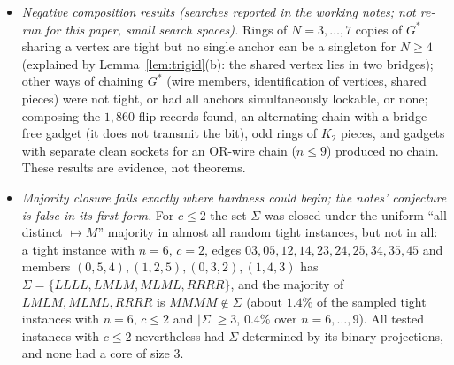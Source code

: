 {\begin{itemize}
\item \emph{Negative composition results (searches reported in the working notes; not re-run for this paper, small search spaces).} Rings of $N=3,\dots,7$ copies of $G^*$ sharing a vertex are tight but no single anchor can be a singleton for $N\ge4$ (explained by Lemma~\ref{lem:trigid}(b): the shared vertex lies in two bridges); other ways of chaining $G^*$ (wire members, identification of vertices, shared pieces) were not tight, or had all anchors simultaneously lockable, or none; composing the $1{,}860$ flip records found, an alternating chain with a bridge-free gadget (it does not transmit the bit), odd rings of $K_2$ pieces, and gadgets with separate clean sockets for an OR-wire chain ($n\le9$) produced no chain. These results are evidence, not theorems.
\item \emph{Majority closure fails exactly where hardness could begin; the notes' conjecture is false in its first form.} For $c\le2$ the set $\Sigma$ was closed under the uniform ``all distinct $\mapsto M$'' majority in almost all random tight instances, but not in all: a tight instance with $n=6$, $c=2$, edges $03,05,12,14,23,24,25,34,35,45$ and members $(0,5,4),(1,2,5),(0,3,2),(1,4,3)$ has $\Sigma=\{LLLL,LMLM,MLML,RRRR\}$, and the majority of $LMLM,MLML,RRRR$ is $MMMM\notin\Sigma$ (about $1.4\%$ of the sampled tight instances with $n=6$, $c\le2$ and $|\Sigma|\ge3$, $0.4\%$ over $n=6,\dots,9$). All tested instances with $c\le2$ nevertheless had $\Sigma$ determined by its binary projections, and none had a core of size $3$.
\end{itemize}}

